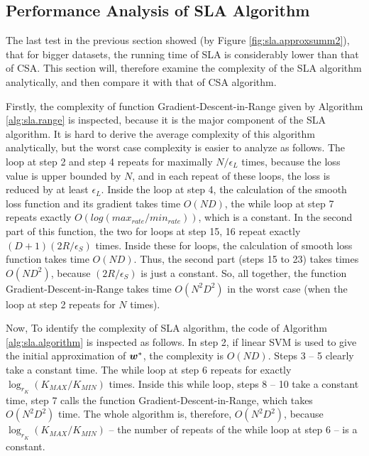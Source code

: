 \subsection{Performance Analysis of SLA Algorithm}
\label{sec:sla.performance}

The last test in the previous section showed (by Figure \ref{fig:sla.approxsumm2}), that for bigger datasets, the running time of SLA is considerably lower than that of CSA. This section will, therefore examine the complexity of the SLA algorithm analytically, and then compare it with that of CSA algorithm. 

Firstly, the complexity of function {\sc Gradient-Descent-in-Range} given by Algorithm \ref{alg:sla.range} is inspected, because it is the major component of the SLA algorithm. It is hard to derive the average complexity of this algorithm analytically, but the worst case complexity is easier to analyze as follows. The loop at step 2 and step 4 repeats for maximally $N/\epsilon_L$ times, because the loss value is upper bounded by $N$, and in each repeat of these loops, the loss is reduced by at least $\epsilon_L$. Inside the loop at step 4, the calculation of the smooth loss function and its gradient takes time $O(ND)$, the while loop at step 7 repeats exactly $O(log(max_{rate} / min_{rate}))$, which is a constant. In the second part of this function, the two for loops at step 15, 16 repeat exactly $(D+1) (2R/\epsilon_S)$ times. Inside these for loops, the calculation of smooth loss function takes time $O(ND)$. Thus, the second part (steps 15 to 23) takes times $O(ND^2)$, because $(2R/\epsilon_S)$ is just a constant. So, all together, the function {\sc Gradient-Descent-in-Range}  takes time $O(N^2D^2)$ in the worst case (when the loop at step 2 repeats for $N$ times).

Now, To identify the complexity of SLA algorithm, the code of Algorithm \ref{alg:sla.algorithm} is inspected as follows. In step 2, if linear SVM is used to give the initial approximation of $\boldsymbol{w}^*$, the complexity is $O(ND)$. Steps 3 -- 5 clearly take a constant time. The while loop at step 6 repeats for exactly $\log_{r_K} (K_{MAX} / K_{MIN})$ times. Inside this while loop, steps 8 -- 10 take a constant time, step 7 calls the function {\sc Gradient-Descent-in-Range}, which takes $O(N^2D^2)$ time. The whole algorithm is, therefore, $O(N^2D^2)$, because $\log_{r_K} (K_{MAX} / K_{MIN})$ -- the number of repeats of the while loop at step 6 -- is a constant. 

